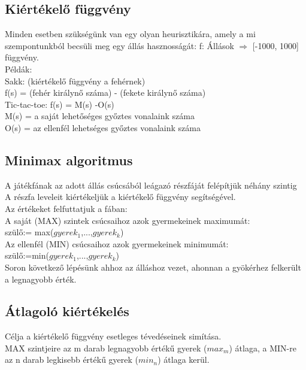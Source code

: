 \documentclass{article}
\begin{document}
	 \newpage
	 \subsection{Kiértékelő függvény}
	 Minden esetben szükségünk van egy olyan heurisztikára, amely a mi szempontunkból becsüli meg egy állás hasznosságát: f: Állások $\Rightarrow$ [-1000, 1000] függvény.\\
	 Példák: \\
	 Sakk: (kiértékelő függvény a fehérnek)\\
	 f(s) = (fehér királynő száma) - (fekete királynő száma)\\
	 Tic-tac-toe: f(s) = M(s) -O(s)\\
	 M(s) = a saját lehetőséges győztes vonalaink száma\\
	 O(s) = az ellenfél lehetséges győztes vonalaink száma\\
	 
	 \subsection{Minimax algoritmus}
	 A játékfának az adott állás csúcsából leágazó részfáját felépítjük néhány szintig\\
	 A részfa leveleit kiértékeljük a kiértékelő függvény segítségével.\\
	 Az értékeket felfuttatjuk a fában:\\
	 \hspace*{1em} A saját (MAX) szintek csúcsaihoz azok gyermekeinek maximumát:\\
	 \hspace*{1em} szülő:= max($gyerek_1$,...,$gyerek_k$)\\
	 \hspace*{1em} Az ellenfél (MIN) csúcsaihoz azok gyermekeinek minimumát:\\ 
	 \hspace*{1em} szülő:=min($gyerek_1$,...,$gyerek_k$)\\
	 Soron következő lépésünk ahhoz az álláshoz vezet, ahonnan a gyökérhez felkerült a legnagyobb érték.
	 
	 \subsection{Átlagoló kiértékelés}
	 Célja a kiértékelő függvény esetleges tévedéseinek simítása.\\
	 MAX szintjeire az m darab legnagyobb értékű gyerek ($max_m$) átlaga, a MIN-re az n darab legkisebb értékű gyerek ($min_n$) átlaga kerül.
	 
\end{document}
